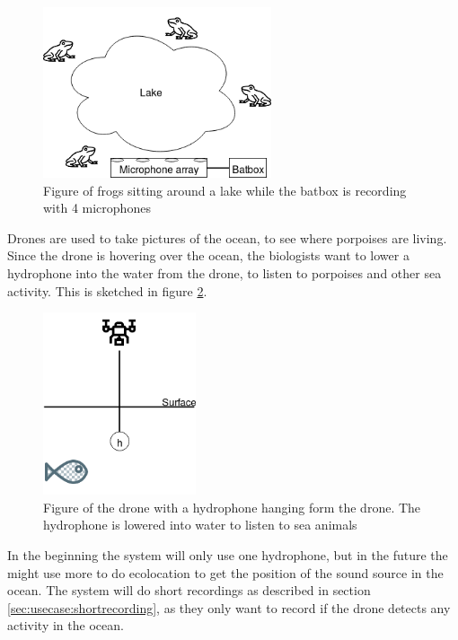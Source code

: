 \begin{figure}[H]
	\centering
	\includegraphics[width=0.6\textwidth]{figures/usecases_frogs}
	\caption{Figure of frogs sitting around a lake while the batbox is recording with 4 microphones} \label{fig:usecase:frogs}
\end{figure}

 \label{sec:usecase:drone}
Drones are used to take pictures of the ocean, to see where porpoises are living.
Since the drone is hovering over the ocean, the biologists want to lower a hydrophone into the water from the drone, to listen to porpoises and other sea activity. This is sketched in figure \ref{fig:usecase:drone}.

\begin{figure}[h!]
	\centering
	\includegraphics[width=0.4\textwidth]{figures/usecase_drone}
	\caption{Figure of the drone with a hydrophone hanging form the drone. The hydrophone is lowered into water to listen to sea animals}\label{fig:usecase:drone}
\end{figure}

In the beginning the system will only use one hydrophone, but in the future the might use more to do ecolocation to get the position of the sound source in the ocean.
The system will do short recordings as described in section \ref{sec:usecase:shortrecording}, as they only want to record if the drone detects any activity in the ocean.

